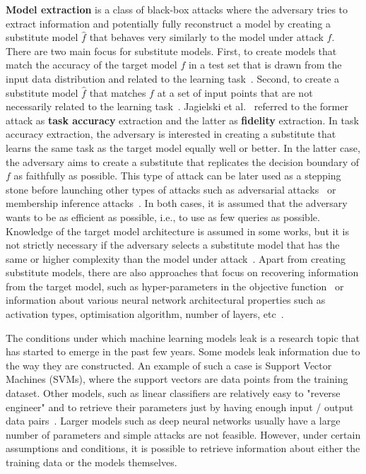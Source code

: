 \label{subsec:model_extraction}
\textbf{Model extraction} is a class of black-box attacks where the adversary tries to extract information and potentially fully reconstruct a model by creating a substitute model $\hat{f}$ that behaves very similarly to the model under attack $f$. There are two main focus for substitute models. First, to create models that match the accuracy of the target model $f$ in a test set that is drawn from the input data distribution and related to the learning task~. Second, to create a substitute model $\hat{f}$ that matches $f$ at a set of input points that are not necessarily related to the learning task~. Jagielski et al.~ referred to the former attack as \textbf{task accuracy} extraction and the latter as \textbf{fidelity} extraction. In task accuracy extraction, the adversary is interested in creating a substitute that learns the same task as the target model equally well or better. In the latter case, the adversary aims to create a substitute that replicates the decision boundary of $f$ as faithfully as possible. This type of attack can be later used as a stepping stone before launching other types of attacks such as adversarial attacks~ or membership inference attacks~. In both cases, it is assumed that the adversary wants to be as efficient as possible, i.e., to use as few queries as possible. Knowledge of the target model architecture is assumed in some works, but it is not strictly necessary if the adversary selects a substitute model that has the same or higher complexity than the model under attack~. 
Apart from creating substitute models, there are also approaches that focus on recovering information from the target model, such as hyper-parameters in the objective function~ or information about various neural network architectural properties such as activation types, optimisation algorithm, number of layers, etc~.

\label{sec:why_leak}
The conditions under which machine learning models leak is a research topic that has started to emerge in the past few years. Some models leak information due to the way they are constructed. An example of such a case is Support Vector Machines (SVMs), where the support vectors are data points from the training dataset. Other models, such as linear classifiers are relatively easy to "reverse engineer" and to retrieve their parameters just by having enough input / output data pairs~. Larger models such as deep neural networks usually have a large number of parameters and simple attacks are not feasible. However, under certain assumptions and conditions, it is possible to retrieve information about either the training data or the models themselves.

